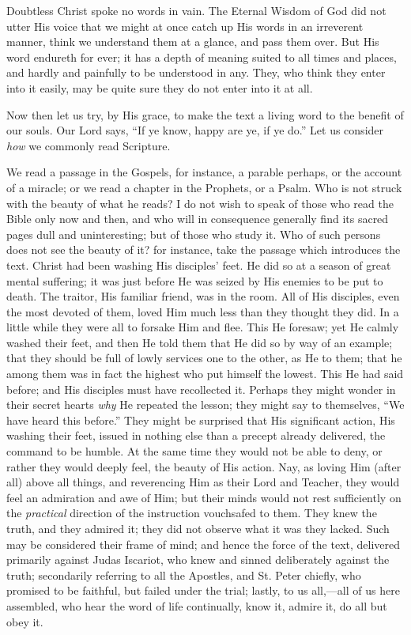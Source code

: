 Doubtless Christ spoke no words in vain. The Eternal
Wisdom of God did not utter His voice that we might at
once catch up His words in an irreverent manner, think we
understand them at a glance, and pass them over. But His
word endureth for ever; it has a depth of meaning suited
to all times and places, and hardly and painfully to be
understood in any. They, who think they enter into it
easily, may be quite sure they do not enter into it at
all.

Now then let us try, by His grace, to make the text a
living word to the benefit of our souls. Our Lord says,
``If ye know, happy are ye, if ye do.'' Let us
consider \emph{how} we commonly read Scripture.

We read a passage in the Gospels, for instance, a
parable perhaps, or the account of a miracle; or we read
a chapter in the Prophets, or a Psalm. Who is not struck
with the beauty of what he reads? I do not wish to speak
of those who read the Bible only now and then, and who
will in consequence generally find its sacred pages dull
and uninteresting; but of those who study it. Who of such
persons does not see the beauty of it? for instance, take
the passage which introduces the text. Christ had been
washing His disciples' feet. He did so at a season of
great mental suffering; it was just before He was seized
by His enemies to be put to death. The traitor, His
familiar friend, was in the room. All of His disciples,
even the most devoted of them, loved Him much less than
they thought they did. In a little while they were all to
forsake Him and flee. This He foresaw; yet He calmly
washed their feet, and then He told them that He did so
by way of an example; that they should be full of lowly
services one to the other, as He to them; that he among
them was in fact the highest who put himself the lowest.
This He had said before; and His disciples must have
recollected it. Perhaps they might wonder in their secret
hearts \emph{why} He repeated the lesson; they might
say to themselves, ``We have heard this before.''
They might be surprised that His significant action, His
washing their feet, issued in nothing else than a precept
already delivered, the command to be humble. At the same
time they would not be able to deny, or rather they would
deeply feel, the beauty of His action. Nay, as loving Him
(after all) above all things, and reverencing Him as
their Lord and Teacher, they would feel an admiration and
awe of Him; but their minds would not rest sufficiently
on the \emph{practical} direction of the instruction
vouchsafed to them. They knew the truth, and they admired
it; they did not observe what it was they lacked. Such
may be considered their frame of mind; and hence the
force of the text, delivered primarily against Judas
Iscariot, who knew and sinned deliberately against the
truth; secondarily referring to all the Apostles, and St.
Peter chiefly, who promised to be faithful, but failed
under the trial; lastly, to us all,—all of us here
assembled, who hear the word of life continually, know
it, admire it, do all but obey it.


